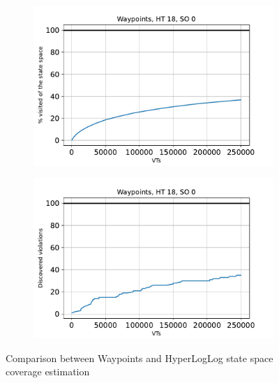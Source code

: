 \documentclass[
fancyheadings, %
%
%
]{stsreprt}
\begin{document}
\begin{figure}[h]
    \begin{subfigure}[b]{.5\textwidth}
        \centering
        \includegraphics[width=\textwidth]{../evaluation/output-assets/EXP-01-comparison-waypoints-hll-1.pdf}
        \label{fig:evaluation:EXP-01:1}
    \end{subfigure}
    \begin{subfigure}[b]{.5\textwidth}
        \centering
        \includegraphics[width=\textwidth]{../evaluation/output-assets/EXP-01-comparison-waypoints-hll-2.pdf}
        \label{fig:evaluation:EXP-01:2}
    \end{subfigure}
    \caption{Comparison between Waypoints and HyperLogLog state space coverage estimation}
    \label{fig:evaluation:EXP-01}
\end{figure}
\end{document}
